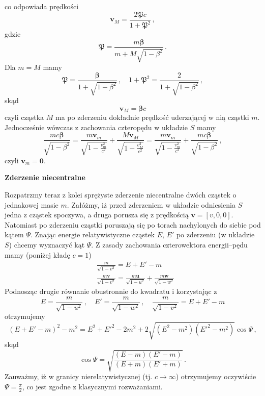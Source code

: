\documentclass[../main.tex]{subfiles}
\begin{document}
co odpowiada prędkości
\begin{equation*}
    \mathbf{v}_M=\frac{2\boldsymbol{\mathfrak{P}}c}{1+\mathfrak{P}^2}\,,
\end{equation*}
gdzie
\begin{equation*}
    \boldsymbol{\mathfrak{P}}=\frac{m\boldsymbol{\beta}}{m+M\sqrt{1-\beta^2}}\,.
\end{equation*}
Dla \(m=M\) mamy
\begin{equation*}
    \boldsymbol{\mathfrak{P}}=\frac{\boldsymbol{\beta}}{1+\sqrt{1-\beta^2}}\,,\quad 1+\mathfrak{P}^2=\frac{2}{1+\sqrt{1-\beta^2}}\,,
\end{equation*}
skąd
\begin{equation*}
    \mathbf{v}_M=\boldsymbol{\beta}c
\end{equation*}
czyli cząstka \(M\) ma po zderzeniu dokładnie prędkość uderzającej w nią cząstki \(m\). Jednocześnie
wówczas z zachowania czteropędu w układzie \(S\) mamy
\begin{equation*}
    \frac{mc\boldsymbol{\beta}}{\sqrt{1-\beta^2}}=\frac{m\mathbf{v}_m}{\sqrt{1-\frac{v_m^2}{c^2}}}+\frac{M\mathbf{v}_M}{\sqrt{1-\frac{v_M^2}{c^2}}}=\frac{m\mathbf{v}_m}{\sqrt{1-\frac{v_m^2}{c^2}}}+\frac{mc\boldsymbol{\beta}}{\sqrt{1-\beta^2}}\,,
\end{equation*}
czyli \(\mathbf{v}_m=\mathbf{0}\).
\medskip

\noindent\textbf{Zderzenie niecentralne}
\medskip

Rozpatrzmy teraz z kolei sprężyste zderzenie niecentralne dwóch cząstek o jednakowej masie \(m\).
Załóżmy, iż przed zderzeniem w układzie odniesienia \(S\) jedna z cząstek spoczywa, a druga porusza
się z prędkością \(\mathbf{v}=[v,0,0]\). Natomiast po zderzeniu cząstki poruszają się po torach
nachylonych do siebie pod kątem \(\Psi\). Znając energie relatywistyczne cząstek \(E\), \(E'\) po
zderzeniu (w układzie \(S\)) chcemy wyznaczyć kąt \(\Psi\). Z zasady zachowania czterowektora
energii--pędu mamy (poniżej kładę \(c=1\))
\begin{equation*}
\begin{split}
    &\frac{m}{\sqrt{1-v^2}}=E+E'-m\\
    &\frac{m\mathbf{v}}{\sqrt{1-v^2}}=\frac{m\mathbf{u}}{\sqrt{1-u^2}}+\frac{m\mathbf{w}}{\sqrt{1-w^2}}
\end{split}
\end{equation*}
Podnosząc drugie równanie obustronnie do kwadratu i korzystając z 
\begin{equation*}
    E=\frac{m}{\sqrt{1-u^2}}\,,\quad E'=\frac{m}{\sqrt{1-w^2}}\,,\quad \frac{m}{\sqrt{1-v^2}}=E+E'-m
\end{equation*}
otrzymujemy
\begin{equation*}
    (E+E'-m)^2-m^2=E^2+E'^2-2m^2+2\sqrt{(E^2-m^2)(E'^2-m^2)}\cos\Psi\,,
\end{equation*}
skąd
\begin{equation*}
    \cos\Psi=\sqrt{\frac{(E-m)(E'-m)}{(E+m)(E'+m)}}\,.
\end{equation*}
Zauważmy, iż w granicy nierelatywistycznej (tj. \(c\to\infty\)) otrzymujemy oczywiście
\(\Psi=\frac{\pi}{2}\), co jest zgodne z klasycznymi rozważaniami.
\end{document}
